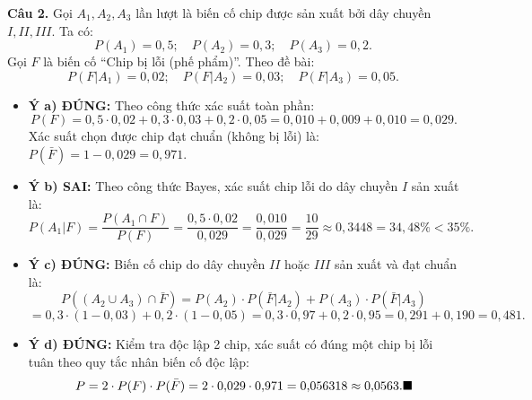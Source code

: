 \documentclass[12pt,a4paper]{article}
\begin{document}
\vspace{0.2cm}\noindent\textbf{Câu 2.}
Gọi $A_1, A_2, A_3$ lần lượt là biến cố chip được sản xuất bởi dây chuyền $I, II, III$. Ta có:
$$P(A_1) = 0{,}5; \quad P(A_2) = 0{,}3; \quad P(A_3) = 0{,}2.$$
Gọi $F$ là biến cố ``Chip bị lỗi (phế phẩm)''. Theo đề bài:
$$P(F|A_1) = 0{,}02; \quad P(F|A_2) = 0{,}03; \quad P(F|A_3) = 0{,}05.$$
\begin{itemize}[leftmargin=*]
    \item \textbf{Ý a) ĐÚNG:} Theo công thức xác suất toàn phần:
    $$P(F) = 0{,}5 \cdot 0{,}02 + 0{,}3 \cdot 0{,}03 + 0{,}2 \cdot 0{,}05 = 0{,}010 + 0{,}009 + 0{,}010 = 0{,}029.$$
    Xác suất chọn được chip đạt chuẩn (không bị lỗi) là: $P(\bar{F}) = 1 - 0{,}029 = 0{,}971$.
    \item \textbf{Ý b) SAI:} Theo công thức Bayes, xác suất chip lỗi do dây chuyền $I$ sản xuất là:
    $$P(A_1|F) = \dfrac{P(A_1 \cap F)}{P(F)} = \dfrac{0{,}5 \cdot 0{,}02}{0{,}029} = \dfrac{0{,}010}{0{,}029} = \dfrac{10}{29} \approx 0{,}3448 = 34{,}48\% < 35\%.$$
    \item \textbf{Ý c) ĐÚNG:} Biến cố chip do dây chuyền $II$ hoặc $III$ sản xuất và đạt chuẩn là:
    $$P((A_2 \cup A_3) \cap \bar{F}) = P(A_2) \cdot P(\bar{F}|A_2) + P(A_3) \cdot P(\bar{F}|A_3)$$
    $$= 0{,}3 \cdot (1 - 0{,}03) + 0{,}2 \cdot (1 - 0{,}05) = 0{,}3 \cdot 0{,}97 + 0{,}2 \cdot 0{,}95 = 0{,}291 + 0{,}190 = 0{,}481.$$
    \item \textbf{Ý d) ĐÚNG:} Kiểm tra độc lập 2 chip, xác suất có đúng một chip bị lỗi tuân theo quy tắc nhân biến cố độc lập:
    $$P = 2 \cdot P(F) \cdot P(\bar{F}) = 2 \cdot 0{,}029 \cdot 0{,}971 = 0{,}056318 \approx 0{,}0563.\hfill\blacksquare$$
\end{itemize}
\end{document}

